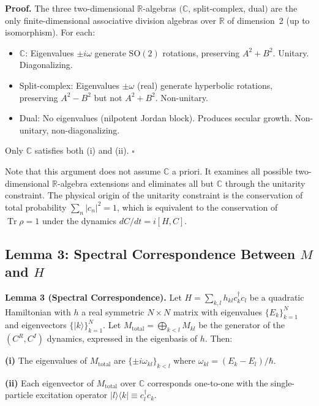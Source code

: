 \documentclass[aps,pra,preprint,groupedaddress,amsmath,amssymb,floatfix]{revtex4-2}
\begin{document}
\textbf{Proof.} The three two-dimensional $\mathbb{R}$-algebras $(\mathbb{C}$, split-complex, dual$)$ are the only finite-dimensional associative division algebras over $\mathbb{R}$ of dimension~2 (up to isomorphism). For each:

\begin{itemize}
\item $\mathbb{C}$: Eigenvalues $\pm i\omega$ generate $\mathrm{SO}(2)$ rotations, preserving $A^2 + B^2$. Unitary. Diagonalizing.
\item Split-complex: Eigenvalues $\pm\omega$ (real) generate hyperbolic rotations, preserving $A^2 - B^2$ but not $A^2 + B^2$. Non-unitary.
\item Dual: No eigenvalues (nilpotent Jordan block). Produces secular growth. Non-unitary, non-diagonalizing.
\end{itemize}

Only $\mathbb{C}$ satisfies both (i) and (ii). $\square$

Note that this argument does not assume $\mathbb{C}$ a priori. It examines all possible two-dimensional $\mathbb{R}$-algebra extensions and eliminates all but $\mathbb{C}$ through the unitarity constraint. The physical origin of the unitarity constraint is the conservation of total probability $\sum_n |c_n|^2 = 1$, which is equivalent to the conservation of $\operatorname{Tr}\rho = 1$ under the dynamics $dC/dt = i[H,C]$.

\subsection{Lemma 3: Spectral Correspondence Between $M$ and $H$}
\label{sec:th1_lemma3}

\textbf{Lemma 3 (Spectral Correspondence).} Let $H = \sum_{k,l} h_{kl} c^\dagger_k c_l$ be a quadratic Hamiltonian with $h$ a real symmetric $N \times N$ matrix with eigenvalues $\{E_k\}_{k=1}^N$ and eigenvectors $\{|k\rangle\}_{k=1}^N$. Let $M_{\text{total}} = \bigoplus_{k<l} M_{kl}$ be the generator of the $(C^R, C^I)$ dynamics, expressed in the eigenbasis of $h$. Then:

\textbf{(i)} The eigenvalues of $M_{\text{total}}$ are $\{\pm i\omega_{kl}\}_{k<l}$ where $\omega_{kl} = (E_k - E_l)/\hbar$.

\textbf{(ii)} Each eigenvector of $M_{\text{total}}$ over $\mathbb{C}$ corresponds one-to-one with the single-particle excitation operator $|l\rangle\langle k| \equiv c^\dagger_l c_k$.
\end{document}
